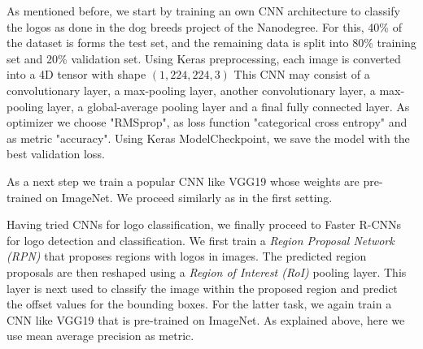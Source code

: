 \documentclass{scrartcl}
\begin{document}
As mentioned before, we start by training an own CNN architecture to classify the logos as done in the dog breeds project of the Nanodegree. For this, 40\% of the dataset is forms the test set, and the remaining data is split into 80\% training set and 20\% validation set. Using Keras preprocessing, each image is converted into a 4D tensor with shape $(1,224,224,3)$
This CNN may consist of a convolutionary layer, a max-pooling layer, another convolutionary layer, a max-pooling layer, a global-average pooling layer and a final fully connected layer. As optimizer we choose "RMSprop", as loss function "categorical cross entropy" and as metric "accuracy".
Using Keras ModelCheckpoint, we save the model with the best validation loss.

As a next step we train a popular CNN like VGG19 whose weights are pre-trained on ImageNet. We proceed similarly as in the first setting.

Having tried CNNs for logo classification, we finally proceed to Faster R-CNNs for logo detection and classification.
We first train a \emph{Region Proposal Network (RPN)} that proposes regions with logos in images.  The predicted region proposals are then reshaped using a \emph{Region of Interest (RoI)} pooling layer. This layer is next used to classify the image within the proposed region and predict the offset values for the bounding boxes. For the latter task, we again train a CNN like VGG19 that is pre-trained on ImageNet.
As  explained above, here we use mean average precision as metric.




\end{document}
